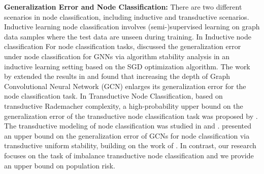\textbf{Generalization Error and Node Classification:} There are two different scenarios in node classification, including inductive and transductive scenarios. Inductive learning node classification involves (semi-)supervised learning on graph data samples where the test data are unseen during training. In Inductive node classification For node classification tasks, \citep{verma2019stability} discussed the generalization error under node classification for GNNs via algorithm stability analysis in an inductive learning setting based on the SGD optimization algorithm. The work by \citet{zhou2021generalization} extended the results in \citep{verma2019stability} and found that increasing the depth of Graph Convolutional Neural Network (GCN) enlarges its generalization error for the node classification task. In Transductive Node Classification, based on transductive Rademacher complexity, a high-probability upper bound on the generalization error of the transductive node classification task was proposed by \citet{esser2021learning}. The transductive modeling of node classification was studied in \citep{oono2020optimization} and \citep{tang2023towards}. \citep{cong2021provable} presented an upper bound on the generalization error of GCNs for node classification via transductive uniform stability, building on the work of \citep{el2006stable}. In contrast, our research focuses on the task of imbalance transductive node classification and we provide an upper bound on population risk.

